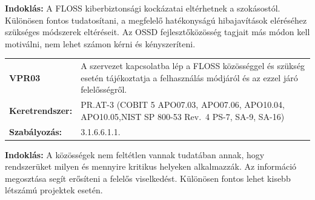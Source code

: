 \documentclass[12pt,magyar,a4paper,oneside]{scrreprt}
\begin{document}
\textbf{Indoklás: } A FLOSS kiberbiztonsági kockázatai eltérhetnek a
szokásostól. Különösen fontos tudatosítani, a megfelelő hatékonyságú
hibajavítások eléréséhez szükséges módszerek eltéréseit. Az OSSD
fejlesztőközösség tagjait más módon kell motiválni, nem lehet számon
kérni és kényszeríteni.

\begin{longtable}[]{@{}ll@{}}
\toprule
\endhead
\begin{minipage}[t]{0.16\columnwidth}\raggedright
\textbf{VPR03}\strut
\end{minipage} & \begin{minipage}[t]{0.79\columnwidth}\raggedright
A szervezet kapcsolatba lép a FLOSS közösséggel és szükség esetén
tájékoztatja a felhasználás módjáról és az ezzel járó
felelősségről.\strut
\end{minipage}\tabularnewline
\begin{minipage}[t]{0.16\columnwidth}\raggedright
\textbf{Keretrendszer:}\strut
\end{minipage} & \begin{minipage}[t]{0.79\columnwidth}\raggedright
PR.AT-3 (COBIT 5 APO07.03, APO07.06, APO10.04, APO10.05,NIST SP 800-53
Rev.~4 PS-7, SA-9, SA-16)\strut
\end{minipage}\tabularnewline
\begin{minipage}[t]{0.16\columnwidth}\raggedright
\textbf{Szabályozás:}\strut
\end{minipage} & \begin{minipage}[t]{0.79\columnwidth}\raggedright
3.1.6.6.1.1.\strut
\end{minipage}\tabularnewline
\bottomrule
\end{longtable}

\textbf{Indoklás: } A közösségek nem feltétlen vannak tudatában annak,
hogy rendszerüket milyen és mennyire kritikus helyeken alkalmazzák. Az
információ megosztása segít erősíteni a felelős viselkedést. Különösen
fontos lehet kisebb létszámú projektek esetén.
\end{document}
